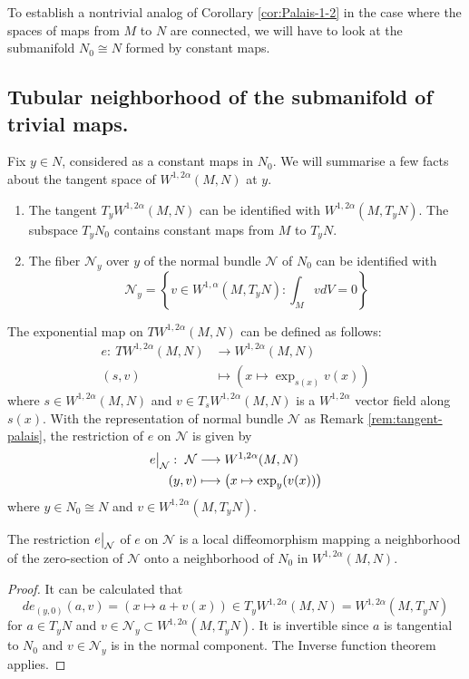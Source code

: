 To establish a nontrivial analog of Corollary \ref{cor:Palais-1-2} in the case where the
spaces of maps from \(M\) to \(N\) are connected, we will have to look at the
submanifold \(N_0\cong N\) formed by constant maps.

\subsection{Tubular neighborhood of the submanifold of trivial maps.}
\label{sec:orgde54354}

Fix \(y\in N\), considered as a constant maps in \(N_0\). We will summarise a few facts about the tangent space of \(W^{1,2\alpha}(M,N)\) at \(y\).

\begin{remark}
\label{rem:tangent-palais}
\begin{enumerate}
\item The tangent \(T_y W^{1, 2\alpha}(M,N)\) can be identified with \(W^{1,2\alpha}(M, T_y
   N)\). The subspace \(T_y N_0\) contains constant maps from \(M\) to \(T_y N\).
\item The fiber \(\mathcal{N}_y\) over \(y\) of the normal bundle \(\mathcal{N}\) of \(N_0\) can be identified with
\[
    \mathcal{N}_y = \left\{v\in W^{1,\alpha}(M, T_y N): \int_M v dV = 0\right\}
   \]
\end{enumerate}
\end{remark}

The exponential map on \(TW^{1,2\alpha}(M,N)\) can be defined as follows:
\begin{align*}
  e:\ TW^{1,2\alpha}(M,N) & \longrightarrow W^{1,2\alpha}(M,N)\\
  (s,v) 		  &\longmapsto \left(x\mapsto \exp_{s(x)}v(x) \right)
\end{align*}
where \(s\in W^{1,2\alpha}(M,N)\) and \(v\in T_s W^{1,2\alpha}(M,N)\) is a \(W^{1,2\alpha}\) vector field along \(s(x)\). With the representation of normal bundle
\(\mathcal{N}\) as Remark \ref{rem:tangent-palais}, the restriction of \(e\) on \(\mathcal{N}\) is given by
\begin{align*}
\restr{e}{\mathcal{N}}:\ \mathcal{N} &\longrightarrow  W^{1,2\alpha}(M,N)\\
			 (y,v) &\longmapsto	       \left(x\mapsto \exp_y (v(x)) \right)
\end{align*}
where \(y\in N_0 \cong N\) and \(v \in W^{1,2\alpha}(M, T_yN)\).

\begin{lemma}
\label{lem:local-isom-e}
The restriction \(\restr{e}{\mathcal{N}}\) of \(e\) on \(\mathcal{N}\) is a local
diffeomorphism mapping a neighborhood of the zero-section of \(\mathcal{N}\) onto a
neighborhood of \(N_0\) in \(W^{1,2\alpha}(M,N)\).
\end{lemma}
\begin{proof}
It can be calculated that 
\[
  de_{(y,0)}(a,v) = \left(x\mapsto a + v(x)\right) \in T_yW^{1,2\alpha}(M,N) =
W^{1,2\alpha}(M, T_yN)
\]
for \(a\in T_y N\) and \(v\in \mathcal{N}_y \subset W^{1,2\alpha}(M, T_y N)\). It
is invertible since \(a\) is tangential to \(N_0\) and \(v\in \mathcal{N}_y\) is
in the normal component. The Inverse function theorem applies.
\end{proof}

